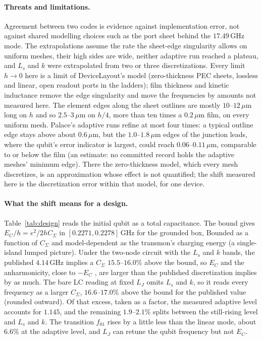 \documentclass{anvil-paper}
\begin{document}
\paragraph{Threats and limitations.}
Agreement between two codes is evidence against implementation error, not
against shared modelling choices such as the port sheet behind the
$17.49$\,GHz mode. The extrapolations assume the rate the sheet-edge
singularity allows on uniform meshes, their high sides are wide, neither
adaptive run reached a plateau, and $L_s$ and $k$ were extrapolated from
two or three discretizations. Every limit $h \to 0$ here is a limit of
DeviceLayout's model (zero-thickness PEC sheets, lossless and linear, open
readout ports in the ladders); film thickness and kinetic inductance remove
the edge singularity and move the frequencies by amounts not measured
here. The element edges
along the sheet outlines are mostly $10$--$12\,\mu$m long on $h$ and so
$2.5$--$3\,\mu$m on $h/4$, more than ten times a $0.2\,\mu$m film, on
every uniform mesh. Palace's adaptive runs refine at most four times: a
typical outline edge stays above about $0.6\,\mu$m, but the
$1.0$--$1.8\,\mu$m edges of the junction leads, where the qubit's error
indicator is largest, could reach $0.06$--$0.11\,\mu$m, comparable to or
below the film (an estimate: no committed record holds the adaptive
meshes' minimum edge). There the zero-thickness model, which every mesh
discretizes, is an approximation whose effect is not quantified; the shift
measured here is the discretization error within that model, for one
device.

\paragraph{What the shift means for a design.}
Table~\ref{tab:design} reads the initial qubit as a total capacitance. The
bound gives $E_C/h = e^2/2hC_\Sigma$ in $[0.2271, 0.2278]$\,GHz for the
grounded box, Bounded as a function of $C_\Sigma$ and model-dependent as
the transmon's charging energy (a single-island lumped picture). Under the
two-node circuit with the $L_s$ and $k$ bands, the published $4.14$\,GHz
implies a $C_\Sigma$ $15.5$--$16.0\%$ above the bound, so $E_C$ and the
anharmonicity, close to $-E_C$ \citep{koch2007charge}, are larger than the
published discretization implies by as much. The bare LC reading at fixed
$L_J$ omits $L_s$ and $k$, so it reads every frequency as a larger
$C_\Sigma$, $16.6$--$17.0\%$ above the bound for the published value
(rounded outward). Of that excess, taken as a factor, the measured adaptive level accounts
for $1.145$, and the remaining $1.9$--$2.1\%$ splits between the
still-rising level and $L_s$ and $k$. The transition $f_{01}$ rises by a
little less than the linear mode, about $6.6\%$ at the adaptive level, and
$L_J$ can retune the qubit frequency but not $E_C$.
\end{document}

